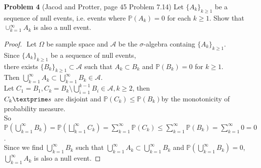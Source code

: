 \documentclass{article}
\newcommand{\bbp}{\mathbb{P}}
\newcommand{\lla}{\mathcal{A}}
\begin{document}
 \setcounter{page}{6}
\vspace{3 mm}

\noindent \textbf{Problem 4} (Jacod and Protter, page 45 Problem 7.14) Let $\{A_{k}\}_{k \geq 1}$ be a sequence of null events, i.e. events where $\mathbb{P}(A_{k}) = 0$ for     each $k \geq 1$.  Show that $\cup_{k=1}^{\infty}A_{k}$ is also a null event.

\begin{proof}
 	$ $\newline
	Let $\Omega$ be sample space and $\lla$ be the $\sigma$-algebra containg $\{A_{k}\}_{k \geq 1}$.\\
	Since $\{A_{k}\}_{k \geq 1}$ be a sequence of null events, \\
	there exists $\{B_{k}\}_{k \geq 1} \subset \lla$ such that $A_k \subset B_k$ and $\bbp(B_k) = 0$ for $k \geq 1$.\\
	Then $\bigcup_{k=1}^{\infty} A_k \subset \bigcup_{k=1}^{\infty} B_k \in \lla$.\\
	Let $C_1 = B_1, C_k = B_k\setminus \bigcup_{i=1}^{k-1}B_i \in \lla, k\geq 2$, then\\
	$C_k\textprime s $ are disjoint and $\bbp(C_k) \leq \bbp(B_k) $by the monotonicity of probability measure.\\
	So $\bbp({\bigcup_{k=1}^{\infty} B_k}) = \bbp({\bigsqcup_{k=1}^{\infty} C_k}) = \sum_{k=1}^{\infty}\bbp(C_k) \leq \sum_{k=1}^{\infty}\bbp(B_k) = \sum_{k=1}^{\infty}0 = 0$.\\ 
	Since we find $\bigcup_{k=1}^{\infty} B_k$ such that $\bigcup_{k=1}^{\infty} A_k \subset \bigcup_{k=1}^{\infty} B_k$ and $\bbp({\bigcup_{k=1}^{\infty} B_k}) = 0$,\\
	$\bigcup_{k=1}^{\infty}A_{k}$ is also a null event.
\end{proof}
\end{document}
